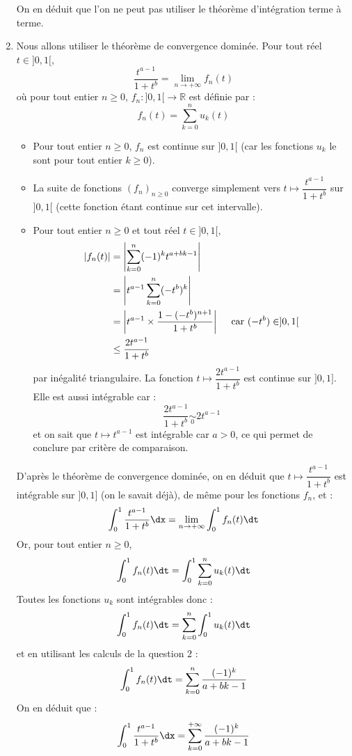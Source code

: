 \documentclass[a4paper,10pt]{report}
\begin{document}
\begin{enumerate}
\noindent On en déduit que l'on ne peut pas utiliser le théorème d'intégration terme à terme.
\item Nous allons utiliser le théorème de convergence dominée. Pour tout réel $t \in ]0,1[$,
$$ \dfrac{t^{a-1}}{1+t^b} = \lim_{n \rightarrow + \infty} f_n(t)$$
où pour tout entier $n \geq 0$, $f_n : ]0,1[ \rightarrow \mathbb{R}$ est définie par :
$$ f_n(t) = \sum_{k=0}^n u_k(t) $$
\begin{itemize}
\item Pour tout entier $n \geq 0$, $f_n$ est continue sur $]0,1[$ (car les fonctions $u_k$ le sont pour tout entier $k \geq 0$).
\item La suite de fonctions $(f_n)_{n \geq 0}$ converge simplement vers $t \mapsto \dfrac{t^{a-1}}{1+t^b}$ sur $]0,1[$ (cette fonction étant continue sur cet intervalle).
\item Pour tout entier $n \geq 0$ et tout réel $t \in ]0,1[$,
\begin{align*}
\vert f_n(t) \vert & = \left\vert \sum_{k=0}^n (-1)^k t^{a+bk-1} \right\vert \\
& =   \left\vert t^{a-1} \sum_{k=0}^n (-t^b)^k  \right\vert \\
& = \left\vert t^{a-1} \times \dfrac{1-(-t^b)^{n+1}}{1+t^b} \right\vert \quad \hbox{ car } (-t^b) \in ]0,1[ \\
& \leq \dfrac{2 t^{a-1}}{1+t^b}
\end{align*}
par inégalité triangulaire. La fonction $t \mapsto \dfrac{2 t^{a-1}}{1+t^b}$ est continue sur $]0,1]$. Elle est aussi intégrable car :
$$ \dfrac{2 t^{a-1}}{1+t^b} \underset{0}{\sim} 2 t^{a-1}$$
et on sait que $t \mapsto t^{a-1}$ est intégrable car $a>0$, ce qui permet de conclure par critère de comparaison.
\end{itemize}
D'après le théorème de convergence dominée, on en déduit que $t \mapsto \dfrac{t^{a-1}}{1+t^b}$ est intégrable sur $]0,1]$ (on le savait déjà), de même pour les fonctions $f_n$, et :
$$ \int_0^1 \dfrac{t^{a-1}}{1+t^b} \dx = \lim_{n \rightarrow + \infty} \int_0^1 f_n(t) \dt$$
Or, pour tout entier $n \geq 0$,
$$ \int_0^1 f_n(t) \dt = \int_0^1 \sum_{k=0}^n u_k(t) \dt $$
Toutes les fonctions $u_k$ sont intégrables donc :
$$  \int_0^1 f_n(t) \dt = \sum_{k=0}^n \int_0^1  u_k(t) \dt $$
et en utilisant les calculs de la question $2$ :
$$  \int_0^1 f_n(t) \dt = \sum_{k=0}^n \dfrac{(-1)^k}{a+bk-1}$$
On en déduit que :
$$\int_0^1 \dfrac{t^{a-1}}{1+t^b} \dx =\sum_{k=0}^{+ \infty} \dfrac{(-1)^k}{a+bk-1}$$
 \end{enumerate}
 
\end{document}

